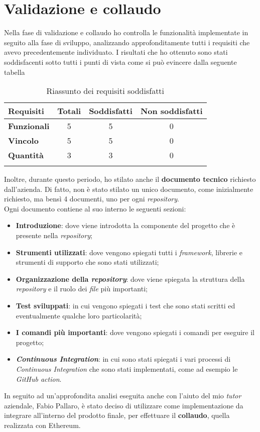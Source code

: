 
\section{Validazione e collaudo}
Nella fase di validazione e collaudo ho controlla le funzionalità implementate in seguito alla fase di sviluppo, analizzando approfonditamente tutti i requisiti che avevo precedentemente individuato. I risultati che ho ottenuto sono stati soddisfacenti sotto tutti i punti di vista come si può evincere dalla seguente tabella

\begin{longtabu}{|l|c|c|c|}

  \hline

  \textbf{Requisiti} & \textbf{Totali} & \textbf{Soddisfatti} & \textbf{Non soddisfatti} \\

  \hline

  \textbf{Funzionali} & 5 & 5 & 0 \\

  \hline

  \textbf{Vincolo} & 5 & 5 & 0 \\

  \hline

  \textbf{Quantità} & 3 & 3 & 0 \\

  \hline

\caption{Riassunto dei requisiti soddisfatti}
\end{longtabu}

Inoltre, durante questo periodo, ho stilato anche il \textbf{documento tecnico} richiesto dall'azienda. Di fatto, non è stato stilato un unico documento, come inizialmente richiesto, ma bensì 4 documenti, uno per ogni \textit{repository}. \\

\noindent Ogni documento contiene al suo interno le seguenti sezioni:
\begin{itemize}
  \item \textbf{Introduzione}: dove viene introdotta la componente del progetto che è presente nella \textit{repository};
  \item \textbf{Strumenti utilizzati}: dove vengono spiegati tutti i \textit{framework}, librerie e strumenti di supporto che sono stati utilizzati;
  \item \textbf{Organizzazione della \textit{repository}}: dove viene spiegata la struttura della \textit{repository} e il ruolo dei \textit{file} più importanti;
  \item \textbf{Test sviluppati}: in cui vengono spiegati i test che sono stati scritti ed eventualmente qualche loro particolarità;
  \item \textbf{I comandi più importanti}: dove vengono spiegati i comandi per eseguire il progetto;
  \item \textbf{\textit{Continuous Integration}}: in cui sono stati spiegati i vari processi di \textit{Continuous Integration} che sono stati implementati, come ad esempio le \textit{GitHub action}.
\end{itemize}

In seguito ad un'approfondita analisi eseguita anche con l'aiuto del mio \textit{tutor} aziendale, Fabio Pallaro, è stato deciso di utilizzare come implementazione da integrare all'interno del prodotto finale, per effettuare il \textbf{collaudo}, quella realizzata con Ethereum.
